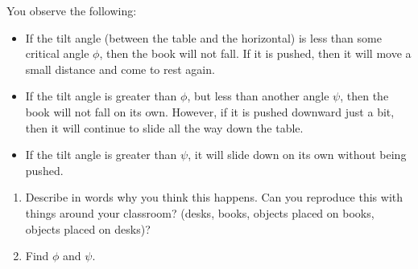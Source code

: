 \documentclass[12pt]{article}
\begin{document}
\begin{enumerate}
You observe the following:
\begin{itemize}

\item If the tilt angle (between the table and the horizontal) is less than some critical angle $\phi$, then the book will not fall. If it is pushed, then it will move a small distance and come to rest again.
\item If the tilt angle is greater than $\phi$, but less than another angle $\psi$, then the book will not fall on its own. However, if it is pushed downward just a bit, then it will continue to slide all the way down the table.
\item If the tilt angle is greater than $\psi$, it will slide down on its own without being pushed.

\end{itemize}

\begin{enumerate}

\item Describe in words why you think this happens. Can you reproduce this with things around your classroom? (desks, books, objects placed on books, objects placed on desks)? 
\vspace{2in}

\item Find $\phi$ and $\psi$.
\end{enumerate}
\end{enumerate}
\end{document}
